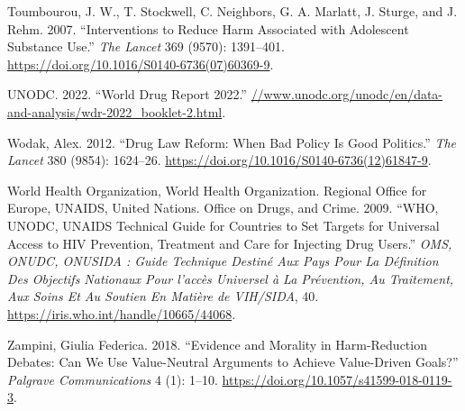 \documentclass[
  letterpaper,
  DIV=11,
  numbers=noendperiod]{scrartcl}
\newlength{\cslhangindent}
\newenvironment{CSLReferences}[2] %
 {\begin{list}{}{%
  \setlength{\itemindent}{0pt}
  \setlength{\leftmargin}{0pt}
  \setlength{\parsep}{0pt}
  \ifodd #1
   \setlength{\leftmargin}{\cslhangindent}
   \setlength{\itemindent}{-1\cslhangindent}
  \fi
  \setlength{\itemsep}{#2\baselineskip}}}
 {\end{list}}
\begin{document}
\begin{CSLReferences}{1}{0}
Toumbourou, J. W., T. Stockwell, C. Neighbors, G. A. Marlatt, J. Sturge,
and J. Rehm. 2007. {``Interventions to Reduce Harm Associated with
Adolescent Substance Use.''} \emph{The Lancet} 369 (9570): 1391--401.
\url{https://doi.org/10.1016/S0140-6736(07)60369-9}.

UNODC. 2022. {``World Drug Report 2022.''}
\href{https:////www.unodc.org/unodc/en/data-and-analysis/wdr-2022_booklet-2.html}{//www.unodc.org/unodc/en/data-and-analysis/wdr-2022\_booklet-2.html}.

Wodak, Alex. 2012. {``Drug Law Reform: When Bad Policy Is Good
Politics.''} \emph{The Lancet} 380 (9854): 1624--26.
\url{https://doi.org/10.1016/S0140-6736(12)61847-9}.

World Health Organization, World Health Organization. Regional Office
for Europe, UNAIDS, United Nations. Office on Drugs, and Crime. 2009.
{``WHO, UNODC, UNAIDS Technical Guide for Countries to Set Targets for
Universal Access to HIV Prevention, Treatment and Care for Injecting
Drug Users.''} \emph{OMS, ONUDC, ONUSIDA : Guide Technique Destiné Aux
Pays Pour La Définition Des Objectifs Nationaux Pour l'accès Universel à
La Prévention, Au Traitement, Aux Soins Et Au Soutien En Matière de
VIH/SIDA}, 40. \url{https://iris.who.int/handle/10665/44068}.

Zampini, Giulia Federica. 2018. {``Evidence and Morality in
Harm-Reduction Debates: Can We Use Value-Neutral Arguments to Achieve
Value-Driven Goals?''} \emph{Palgrave Communications} 4 (1): 1--10.
\url{https://doi.org/10.1057/s41599-018-0119-3}.

\end{CSLReferences}
\end{document}
